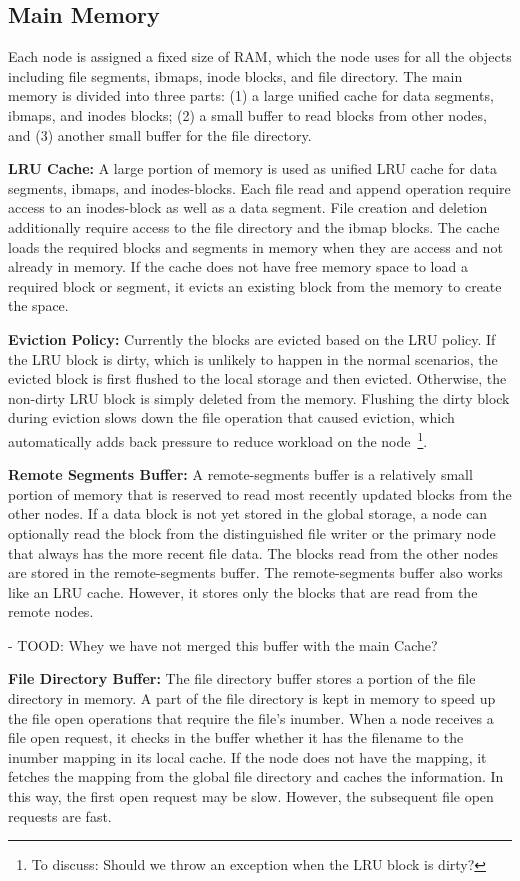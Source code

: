 \documentclass[]{article}
\newcommand{\subtopic}[1]{\vspace{1.5pt} \noindent \textbf{#1}}
\begin{document}
\subsection{Main Memory}

Each node is assigned a fixed size of RAM, which the node uses 
for all the objects including file segments, ibmaps, inode blocks, and
file directory. The main memory is divided into three parts: (1) a large
unified cache for data segments, ibmaps, and inodes blocks; (2) a small
buffer to read blocks from other nodes, and (3) another small buffer
for the file directory.


\subtopic{LRU Cache:} A large portion of memory is used as unified LRU cache
for data segments, ibmaps, and inodes-blocks.  Each file read and append
operation require access to an inodes-block as well as a data segment.  File
creation and deletion additionally require access to the file directory and the
ibmap blocks. The cache loads the required blocks and segments in memory when
they are access and not already in memory.  If the cache does not have free
memory space to load a required block or segment, it evicts an existing block
from the memory to create the space. 

\subtopic{Eviction Policy:} Currently the blocks are evicted based on the LRU
policy.  If the LRU block is dirty, which is unlikely to happen in the normal
scenarios, the evicted block is first flushed to the local storage and then
evicted. Otherwise, the non-dirty LRU block is simply deleted from the memory.
Flushing the dirty block during eviction  slows down the file operation that
caused eviction, which automatically adds back pressure to reduce workload on
the node~\footnote{To discuss: Should we throw an exception when the LRU block 
is dirty?}.

\subtopic{Remote Segments Buffer:} A remote-segments buffer is a relatively
small portion of memory that is reserved to read most recently updated blocks
from the other nodes.  If a data block is not yet stored in the global storage,
a node can optionally read the block from the distinguished file writer or the
primary node that always has the more recent file data. The blocks read from
the other nodes are stored in the remote-segments buffer.  The remote-segments
buffer also works like an LRU cache. However, it stores only the blocks that
are read from the remote nodes.

- TOOD: Whey we have not merged this buffer with the main Cache?

\subtopic{File Directory Buffer:} The file directory buffer stores a portion of
the file directory in memory.  A part of the file directory is kept in memory
to speed up the file open operations that require the file's inumber.  When a
node receives a file open request, it checks in the buffer whether it has the
filename to the inumber mapping in its local cache. If the node does not have
the mapping, it fetches the mapping from the global file directory and caches
the information. In this way, the first open request may be slow. However, the
subsequent file open requests are fast.
\end{document}
